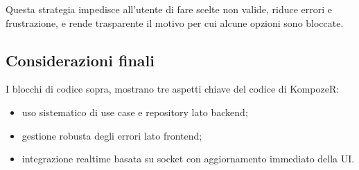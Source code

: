 Questa strategia impedisce all'utente di fare scelte non valide, riduce errori e frustrazione, e rende trasparente il motivo per cui alcune opzioni sono bloccate.

\subsection{Considerazioni finali}

I blocchi di codice sopra, mostrano tre aspetti chiave del codice di KompozeR:

\begin{itemize}
	\item uso sistematico di use case e repository lato backend;
	\item gestione robusta degli errori lato frontend;
	\item integrazione realtime basata su socket con aggiornamento immediato della UI.
\end{itemize}

\newpage